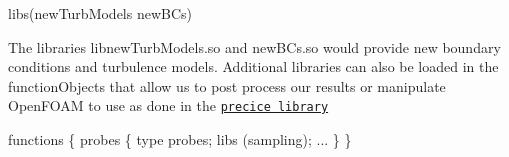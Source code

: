 \begin{DoxyCode}
libs(newTurbModels newBCs)
\end{DoxyCode}


The libraries {\ttfamily libnew\+Turb\+Models.\+so} and {\ttfamily new\+B\+Cs.\+so} would provide new boundary conditions and turbulence models. Additional libraries can also be loaded in the function\+Objects that allow us to post process our results or manipulate Open\+F\+O\+AM to use as done in the \href{https://precice.org/}{\tt precice library}


\begin{DoxyCode}
functions
\{
    probes
    \{
        type            probes;
        libs            (sampling);
        ...
    \}
\}
\end{DoxyCode}
 